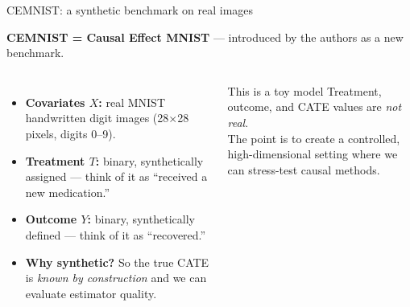 \documentclass[aspectratio=169]{beamer}
\begin{document}
\begin{frame}{CEMNIST: a synthetic benchmark on real images}

\textbf{CEMNIST = Causal Effect MNIST} --- introduced by the authors as a new benchmark.

\bigskip
\begin{columns}
\begin{itemize}
  \item \textbf{Covariates $X$:} real MNIST handwritten digit images
        (28$\times$28 pixels, digits 0--9).
  \item \textbf{Treatment $T$:} binary, synthetically assigned ---
        think of it as ``received a new medication.''
  \item \textbf{Outcome $Y$:} binary, synthetically defined ---
        think of it as ``recovered.''
  \item \textbf{Why synthetic?} So the true CATE is \emph{known by construction}
        and we can evaluate estimator quality.
\end{itemize}

\begin{alertblock}{This is a toy model}
Treatment, outcome, and CATE values are \emph{not real}.\\
The point is to create a controlled, high-dimensional setting where we can stress-test causal methods.
\end{alertblock}
\end{columns}
\end{frame}
\end{document}
